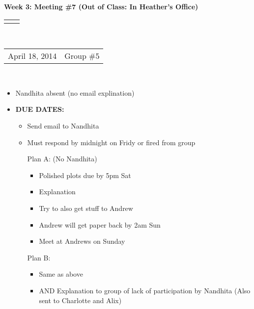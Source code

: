 \documentclass[12pt]{article}
\renewcommand{\title}[1]{\textbf{#1}\\}
\renewcommand{\line}{\begin{tabularx}{\textwidth}{X>{\raggedleft}X}\hline\\\end{tabularx}\\[-0.5cm]}
\newcommand{\leftright}[2]{\begin{tabularx}{\textwidth}{X>{\raggedleft}X}#1%
& #2\\\end{tabularx}\\[-0.5cm]}
\begin{document}
\title{Week 3: Meeting \#7 (Out of Class: In Heather's Office)}
\line
\leftright{April 18, 2014}{Group \#5} %
\vspace{5mm}


\begin{itemize}
\item Nandhita absent (no email explination)
\item \textbf{DUE DATES:}
\begin{itemize}
\item Send email to Nandhita 
\item Must respond by midnight on Fridy or fired from group

Plan A: (No Nandhita)
\begin{itemize}
\item Polished plots due by 5pm  Sat
\item Explanation 
\item Try to also get stuff to Andrew 
\item Andrew will get paper back by 2am Sun 
\item Meet at Andrews on Sunday 

\end{itemize}

Plan B: 
\begin{itemize}
\item Same as above
\item AND Explanation to group of lack of participation by Nandhita (Also sent to Charlotte and Alix)

\end{itemize}
\end{itemize}


\end{itemize}
\end{document}
